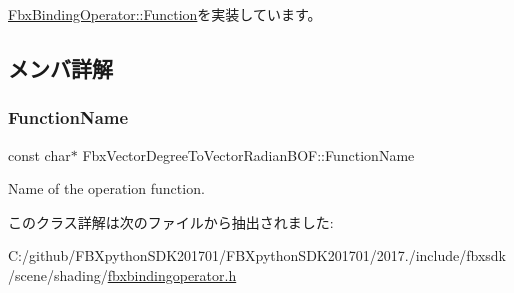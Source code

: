 \hyperlink{class_fbx_binding_operator_1_1_function_a9bbeec993a6e453a6569e7f40a85fd52}{Fbx\+Binding\+Operator\+::\+Function}を実装しています。



\subsection{メンバ詳解}
\mbox{\label{class_fbx_vector_degree_to_vector_radian_b_o_f_a69dbcc81c0c6b15cd9906886b3266481}} 
\subsubsection{\texorpdfstring{Function\+Name}{FunctionName}}
{\footnotesize\ttfamily const char$\ast$ Fbx\+Vector\+Degree\+To\+Vector\+Radian\+B\+O\+F\+::\+Function\+Name\hspace{0.3cm}{\ttfamily [static]}}



Name of the operation function. 



このクラス詳解は次のファイルから抽出されました\+:\begin{DoxyCompactItemize}
\item 
C\+:/github/\+F\+B\+Xpython\+S\+D\+K201701/\+F\+B\+Xpython\+S\+D\+K201701/2017./include/fbxsdk/scene/shading/\hyperlink{fbxbindingoperator_8h}{fbxbindingoperator.\+h}\end{DoxyCompactItemize}
